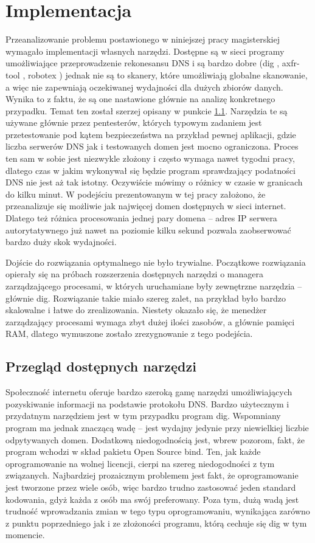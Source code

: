 \chapter{Implementacja}
\noindent Przeanalizowanie problemu postawionego w niniejszej pracy magisterskiej wymagało implementacji własnych narzędzi. Dostępne są w sieci
programy umożliwiające przeprowadzenie rekonesansu DNS i są bardzo dobre (dig \cite{dig}, axfr-tool \cite{python_axfr_test}, robotex \cite{robotex})
jednak nie są to skanery, które umożliwiają globalne skanowanie, a więc nie zapewniają oczekiwanej wydajności dla dużych zbiorów
danych. Wynika to z faktu, że są one nastawione głównie na analizę konkretnego przypadku. Temat ten został szerzej opisany w punkcie
\ref{narzedzia}.
Narzędzia te są używane głównie przez pentesterów, których typowym zadaniem jest przetestowanie pod kątem bezpieczeństwa na przykład pewnej
aplikacji, gdzie liczba serwerów DNS jak i testowanych domen jest mocno ograniczona. Proces ten sam w sobie jest niezwykle złożony
i często wymaga nawet tygodni pracy, dlatego czas w jakim wykonywał się będzie program sprawdzający podatności DNS nie jest aż tak
istotny. Oczywiście mówimy o różnicy w czasie w granicach do kilku minut. W podejściu prezentowanym w tej pracy założono, że
przeanalizuje się możliwie jak najwięcej domen dostępnych w sieci internet. Dlatego też różnica procesowania jednej pary
domena -- adres IP serwera autorytatywnego już nawet na poziomie kilku sekund pozwala zaobserwować bardzo duży skok wydajności.

Dojście do rozwiązania optymalnego nie było trywialne. Początkowe rozwiązania opierały się na próbach rozszerzenia dostępnych
narzędzi o managera
zarządzającego procesami, w których uruchamiane były zewnętrzne narzędzia -- głównie dig. Rozwiązanie takie miało szereg zalet,
na przykład było bardzo skalowalne i łatwe do zrealizowania. Niestety okazało się, że menedżer zarządzający procesami wymaga
zbyt dużej ilości zasobów, a głównie pamięci RAM, dlatego wymuszone zostało zrezygnowanie z tego podejścia.

\section{Przegląd dostępnych narzędzi}
\label{narzedzia}
\noindent Społeczność internetu oferuje bardzo szeroką gamę narzędzi umożliwiających pozyskiwanie informacji na podstawie protokołu DNS.
Bardzo użytecznym i przydatnym narzędziem jest w tym przypadku program dig. Wspomniany program ma jednak znaczącą wadę -- jest
wydajny jedynie przy niewielkiej liczbie odpytywanych domen. Dodatkową niedogodnością jest, wbrew pozorom, fakt, że program
wchodzi w skład pakietu Open Source bind. Ten, jak każde oprogramowanie na wolnej licencji, cierpi na szereg niedogodności z
tym związanych. Najbardziej prozaicznym problemem jest fakt, że oprogramowanie jest tworzone przez wiele osób, więc bardzo
trudno zastosować jeden standard kodowania, gdyż każda z osób ma swój preferowany. Poza tym, dużą wadą jest trudność wprowadzania
zmian w tego typu oprogramowaniu, wynikająca zarówno z punktu poprzedniego jak i ze złożoności programu, którą cechuje się dig
w tym momencie.

